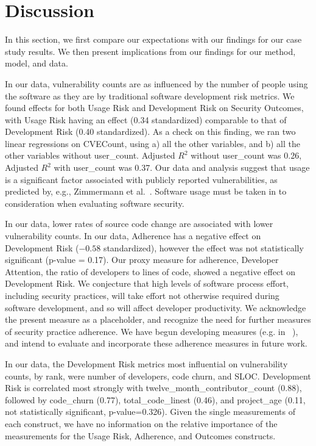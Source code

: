\section{Discussion}
\label{sec:discussion}
\label{sec:case_openhub_discussion} 
 
In this section, we first compare our expectations with our findings for our case study results. We then present implications from our findings for our method, model, and data.

In our data, vulnerability counts are as influenced by the number of people using the software as they are by  traditional software development risk metrics. We found effects for both Usage Risk and Development Risk on Security Outcomes, with Usage Risk having an effect (0.34 standardized) comparable to that of Development Risk (0.40 standardized). As a check on this finding, we ran two linear regressions on CVECount, using a) all the other variables, and b) all the other variables without user\_count. Adjusted $R^2$ without user\_count was 0.26, Adjusted $R^2$ with user\_count was 0.37. Our data and analysis suggest that usage is a significant factor associated with publicly reported vulnerabilities, as predicted by, e.g., Zimmermann et al.~\cite{zimmerman2010searching}. Software usage must be taken in to consideration when evaluating software security.

In our data, lower rates of source code change are associated with lower vulnerability counts. In our data, Adherence has a negative effect on Development Risk ($-0.58$ standardized), however the effect was not statistically significant (p-value = 0.17). Our proxy measure for adherence, Developer Attention, the ratio of developers to lines of code, showed a negative effect on Development Risk. We conjecture that high levels of software process effort, including security practices, will take effort not otherwise required during software development, and so will affect developer productivity. We acknowledge the present measure as a placeholder, and recognize the need for further measures of security practice adherence. We have begun developing measures (e.g. in ~\cite{morrison2017surveying}), and intend to evaluate and incorporate these adherence measures in future work.  

In our data, the Development Risk metrics most influential on vulnerability counts, by rank, were number of developers, code churn, and SLOC. Development Risk is correlated most strongly with twelve\_month\_contributor\_count (0.88), followed by code\_churn (0.77), total\_code\_linest (0.46), and project\_age (0.11, not statistically significant, p-value=0.326).  Given the single measurements of each construct, we have no information on the relative importance of the measurements for the Usage Risk, Adherence, and Outcomes constructs.

